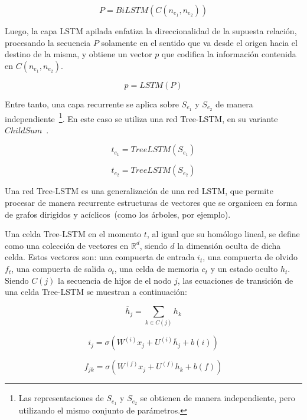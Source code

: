 \begin{equation*}
	P = BiLSTM(C(n_{e_1}, n_{e_2}))
\end{equation*}

Luego, la capa LSTM apilada enfatiza la direccionalidad de la supuesta relación, procesando la secuencia $P$ solamente en el sentido que va desde el origen hacia el destino de la misma, y obtiene un vector $p$ que codifica la información contenida en $C(n_{e_1}, n_{e_2})$.

\begin{equation*}
p = LSTM(P)
\end{equation*}

Entre tanto, una capa recurrente se aplica sobre $S_{e_1}$ y $S_{e_2}$ de manera independiente~\footnote{Las representaciones de $S_{e_1}$ y $S_{e_2}$ se obtienen de manera independiente, pero utilizando el mismo conjunto de parámetros.}.
En este caso se utiliza una red Tree-LSTM, en su variante $Child Sum$~\cite{treeLSTM}.

\begin{equation*}
	t_{e_1} = TreeLSTM(S_{e_1})
\end{equation*}


\begin{equation*}
	t_{e_2} = TreeLSTM(S_{e_2})
\end{equation*}


Una red Tree-LSTM es una generalización de una red LSTM, que permite procesar de manera recurrente estructuras de vectores que se organicen en forma de grafos dirigidos y acíclicos~(como los árboles, por ejemplo).

Una celda Tree-LSTM en el momento $t$, al igual que su homólogo lineal, se define como una colección de vectores en $\mathbb{R}^d$, siendo $d$ la dimensión oculta de dicha celda.
Estos vectores son: una compuerta de entrada $i_t$, una compuerta de olvido $f_t$, una compuerta de salida $o_t$, una celda de memoria $c_t$ y un estado oculto $h_t$. Siendo $C(j)$ la secuencia de hijos de el nodo $j$, las ecuaciones de transición de una celda Tree-LSTM se muestran a continuación:

\begin{equation*}
	\overline{h}_j = \sum_{k\in C(j)} h_k
\end{equation*}

\begin{equation*}
i_j = \sigma(W^{(i)}x_j + U^{(i)}\overline{h}_j + b(i))
\end{equation*}

\begin{equation*}
f_{jk} = \sigma(W^{(f)}x_j + U^{(f)}h_k + b(f))
\end{equation*}


